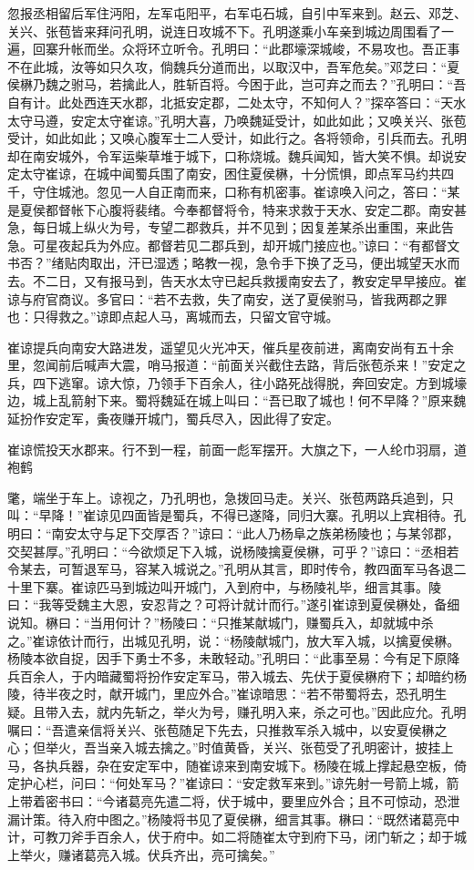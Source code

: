 忽报丞相留后军住沔阳，左军屯阳平，右军屯石城，自引中军来到。赵云、邓芝、关兴、张苞皆来拜问孔明，说连日攻城不下。孔明遂乘小车亲到城边周围看了一遍，回寨升帐而坐。众将环立听令。孔明曰：“此郡壕深城峻，不易攻也。吾正事不在此城，汝等如只久攻，倘魏兵分道而出，以取汉中，吾军危矣。”邓芝曰：“夏侯楙乃魏之驸马，若擒此人，胜斩百将。今困于此，岂可弃之而去？”孔明曰：“吾自有计。此处西连天水郡，北抵安定郡，二处太守，不知何人？”探卒答曰：“天水太守马遵，安定太守崔谅。”孔明大喜，乃唤魏延受计，如此如此；又唤关兴、张苞受计，如此如此；又唤心腹军士二人受计，如此行之。各将领命，引兵而去。孔明却在南安城外，令军运柴草堆于城下，口称烧城。魏兵闻知，皆大笑不惧。却说安定太守崔谅，在城中闻蜀兵围了南安，困住夏侯楙，十分慌惧，即点军马约共四千，守住城池。忽见一人自正南而来，口称有机密事。崔谅唤入问之，答曰：“某是夏侯都督帐下心腹将裴绪。今奉都督将令，特来求救于天水、安定二郡。南安甚急，每日城上纵火为号，专望二郡救兵，并不见到；因复差某杀出重围，来此告急。可星夜起兵为外应。都督若见二郡兵到，却开城门接应也。”谅曰：“有都督文书否？”绪贴肉取出，汗已湿透；略教一视，急令手下换了乏马，便出城望天水而去。不二日，又有报马到，告天水太守已起兵救援南安去了，教安定早早接应。崔谅与府官商议。多官曰：“若不去救，失了南安，送了夏侯驸马，皆我两郡之罪也：只得救之。”谅即点起人马，离城而去，只留文官守城。

崔谅提兵向南安大路进发，遥望见火光冲天，催兵星夜前进，离南安尚有五十余里，忽闻前后喊声大震，哨马报道：“前面关兴截住去路，背后张苞杀来！”安定之兵，四下逃窜。谅大惊，乃领手下百余人，往小路死战得脱，奔回安定。方到城壕边，城上乱箭射下来。蜀将魏延在城上叫曰：“吾已取了城也！何不早降？”原来魏延扮作安定军，夤夜赚开城门，蜀兵尽入，因此得了安定。

崔谅慌投天水郡来。行不到一程，前面一彪军摆开。大旗之下，一人纶巾羽扇，道袍鹤

氅，端坐于车上。谅视之，乃孔明也，急拨回马走。关兴、张苞两路兵追到，只叫：“早降！”崔谅见四面皆是蜀兵，不得已遂降，同归大寨。孔明以上宾相待。孔明曰：“南安太守与足下交厚否？”谅曰：“此人乃杨阜之族弟杨陵也；与某邻郡，交契甚厚。”孔明曰：“今欲烦足下入城，说杨陵擒夏侯楙，可乎？”谅曰：“丞相若令某去，可暂退军马，容某入城说之。”孔明从其言，即时传令，教四面军马各退二十里下寨。崔谅匹马到城边叫开城门，入到府中，与杨陵礼毕，细言其事。陵曰：“我等受魏主大恩，安忍背之？可将计就计而行。”遂引崔谅到夏侯楙处，备细说知。楙曰：“当用何计？”杨陵曰：“只推某献城门，赚蜀兵入，却就城中杀之。”崔谅依计而行，出城见孔明，说：“杨陵献城门，放大军入城，以擒夏侯楙。杨陵本欲自捉，因手下勇士不多，未敢轻动。”孔明曰：“此事至易：今有足下原降兵百余人，于内暗藏蜀将扮作安定军马，带入城去、先伏于夏侯楙府下；却暗约杨陵，待半夜之时，献开城门，里应外合。”崔谅暗思：“若不带蜀将去，恐孔明生疑。且带入去，就内先斩之，举火为号，赚孔明入来，杀之可也。”因此应允。孔明嘱曰：“吾遣亲信将关兴、张苞随足下先去，只推救军杀入城中，以安夏侯楙之心；但举火，吾当亲入城去擒之。”时值黄昏，关兴、张苞受了孔明密计，披挂上马，各执兵器，杂在安定军中，随崔谅来到南安城下。杨陵在城上撑起悬空板，倚定护心栏，问曰：“何处军马？”崔谅曰：“安定救军来到。”谅先射一号箭上城，箭上带着密书曰：“今诸葛亮先遣二将，伏于城中，要里应外合；且不可惊动，恐泄漏计策。待入府中图之。”杨陵将书见了夏侯楙，细言其事。楙曰：“既然诸葛亮中计，可教刀斧手百余人，伏于府中。如二将随崔太守到府下马，闭门斩之；却于城上举火，赚诸葛亮入城。伏兵齐出，亮可擒矣。”

